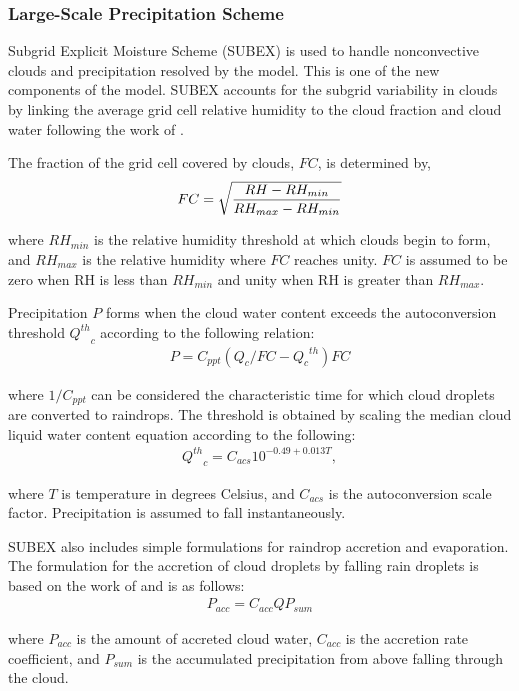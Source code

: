 \subsubsection{Large-Scale Precipitation Scheme}  
Subgrid Explicit Moisture Scheme (SUBEX) is used to handle 
nonconvective clouds and precipitation resolved by the model.
This is one of the new components of the model.  
SUBEX accounts for the subgrid variability in clouds by 
linking the average grid cell relative humidity
to the cloud fraction and cloud water following the work 
of \cite{Sundqvist_89}.  

The fraction of the grid cell covered by clouds, $FC$, is determined 
by,
\begin{eqnarray}
FC = \sqrt{ { {RH - RH_{min}} \over {RH_{max} - RH_{min} }} }
\end{eqnarray}

\noindent
where ${RH_{min}}$ is the relative humidity threshold at which 
clouds begin to form, and ${RH_{max}}$ is the relative humidity
where $FC$ reaches unity.  $FC$ is assumed to be zero when RH is 
less than ${RH_{min}}$ and unity when RH is greater than 
${RH_{max}}$.  

Precipitation $P$ forms when the cloud water content exceeds the 
autoconversion threshold ${Q^{th}}_c$ according to the following 
relation:
\begin{eqnarray}
P = C_{ppt}(Q_c/FC - {{Q_c}^{th}})FC
\end{eqnarray}

\noindent
where $1/C_{ppt}$ can be considered the characteristic time for
which cloud droplets are converted to raindrops.  The 
threshold is obtained by scaling the median cloud liquid 
water content equation according to the following:
\begin{eqnarray}
{Q^{th}}_c = C_{acs} 10^{-0.49 + 0.013T}, 
\end{eqnarray}

\noindent
where $T$ is temperature in degrees Celsius, and $C_{acs}$ is the 
autoconversion scale factor.  Precipitation is assumed to fall
instantaneously.

SUBEX also includes simple formulations for raindrop accretion 
and evaporation.  The formulation for the accretion of cloud 
droplets by falling rain droplets is based on the work of 
\cite{Beheng_94} and is as follows:
\begin{eqnarray}
P_{acc} = C_{acc} Q P_{sum}
\end{eqnarray}

\noindent
where $P_{acc}$ is the amount of accreted cloud water, $C_{acc}$ is 
the accretion rate coefficient, and $P_{sum}$ is the accumulated
precipitation from above falling through the cloud.  

